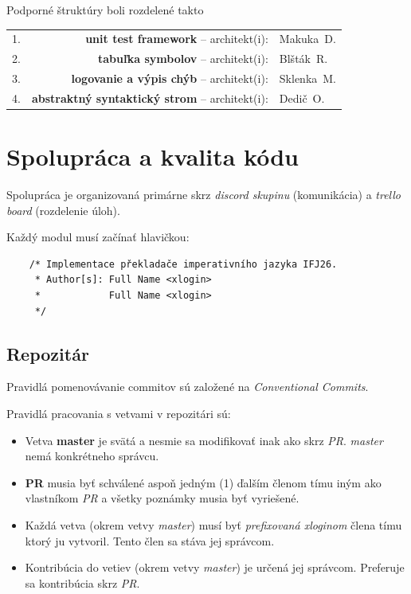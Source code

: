 \documentclass[11pt,a4paper]{article}
\begin{document}
  Podporné štruktúry boli rozdelené takto

  \begin{tabular}{rrl}
    1. & \textbf{unit test framework}          -- architekt(i): & Makuka~D. \\
    2. & \textbf{tabuľka symbolov}             -- architekt(i): & Blšták~R. \\
    3. & \textbf{logovanie a výpis chýb}       -- architekt(i): & Sklenka~M. \\
    4. & \textbf{abstraktný syntaktický strom} -- architekt(i): & Dedič~O. \\
  \end{tabular}

  \section{Spolupráca a kvalita kódu}

  Spolupráca je organizovaná primárne skrz \textit{discord skupinu}
  (komunikácia) a \textit{trello board} (rozdelenie úloh).

  Každý modul musí začínať hlavičkou:

  \begin{verbatim}
    /* Implementace překladače imperativního jazyka IFJ26.
     * Author[s]: Full Name <xlogin>
     *            Full Name <xlogin>
     */
  \end{verbatim}

  \subsection{Repozitár}

  Pravidlá pomenovávanie commitov sú založené na \textit{Conventional
  Commits}\footnotemark.

  Pravidlá pracovania s vetvami v repozitári sú:
  \begin{itemize}
    \item Vetva \textbf{master} je svätá a nesmie sa modifikovať inak ako skrz
      \textit{PR}. \textit{master} nemá konkrétneho správcu.
    \item \textbf{PR} musia byť schválené aspoň jedným (1) ďalším členom tímu
      iným ako vlastníkom \textit{PR} a všetky poznámky musia byť vyriešené.
    \item Každá vetva (okrem vetvy \textit{master}) musí byť \textit{prefixovaná
      xloginom} člena tímu ktorý ju vytvoril. Tento člen sa stáva jej správcom.
    \item Kontribúcia do vetiev (okrem vetvy \textit{master}) je určená jej
      správcom. Preferuje sa kontribúcia skrz \textit{PR}.
  \end{itemize}
\end{document}
